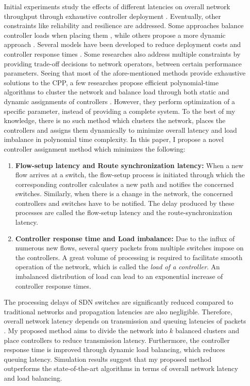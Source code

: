 \documentclass[journal]{IEEEtran}
\begin{document}
Initial experiments study the effects of different latencies on overall network throughput through exhaustive controller deployment \cite{cpp2012heller}. Eventually, other constraints like reliability \cite{hu2013reliability} and resilience \cite{zhang2011resilience} are addressed. Some approaches balance controller loads when placing them \cite{yao2014capacitated}, while others propose a more dynamic approach \cite{yao2015controller}. Several models have been developed to reduce deployment costs \cite{sallahi2015optimal} and controller response times \cite{wang2016dynamic}. Some researches also address multiple constraints by providing trade-off decisions to network operators, between certain performance parameters. Seeing that most of the afore-mentioned methods provide exhaustive solutions to the CPP, a few researches propose efficient polynomial-time algorithms to cluster the network \cite{dbcp2017} and balance load through both static \cite{dbcp2017} and dynamic assignments of controllers \cite{filali2018sdn}. However, they perform optimization of a specific parameter, instead of providing a complete system. To the best of my knowledge, there is no such method which clusters the network, places the controllers and assigns them dynamically to minimize overall latency and load imbalance in polynomial time complexity. In this paper, I propose a novel controller assignment method which minimizes the following:
\begin{enumerate}
	\item \textbf{Flow-setup latency and Route synchronization latency:} When a new flow arrives at a switch, the flow-setup process is initiated through which the corresponding controller calculates a new path and notifies the concerned switches. Similarly, when there is a change in the network, the concerned controllers and switches have to be notified. The delay produced by these processes are called the flow-setup latency and the route-synchronization latency.
	\item \textbf{Controller response time and Load imbalance:} Due to the influx of numerous new flows, several query packets from multiple switches impose on the controllers. A great volume of processing is required to facilitate smooth operation of the network, which is called the \textit{load of a controller}. An imbalanced distribution of load can lead to an exponential increase of controller response times.
\end{enumerate}
The processing delays of SDN switches are significantly reduced compared to traditional networks and propagation latencies are also negligible. Therefore, overall network latency depends on transmission and queuing latencies of packets \cite{forouzan2006data}. My proposed method aims to divide the network into $k$ balanced clusters and place controllers to reduce transmission latency. Furthermore, the controller response time is improved through dynamic load balancing, which reduces queuing latency. Simulation results suggest that my proposed method outperforms the state-of-the-art algorithms in terms of overall network latency and load balancing.
\end{document}
